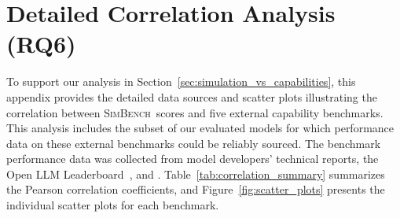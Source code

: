 \documentclass{article} %
\begin{document}
\section{Detailed Correlation Analysis (RQ6)}
\label{app:correlation_plots}

To support our analysis in Section~\ref{sec:simulation_vs_capabilities}, this appendix provides the detailed data sources and scatter plots illustrating the correlation between \textsc{SimBench}\ scores and five external capability benchmarks. This analysis includes the subset of our evaluated models for which performance data on these external benchmarks could be reliably sourced. The benchmark performance data was collected from model developers' technical reports, the Open LLM Leaderboard~\citet{open-llm-leaderboard-v2}, and \citet{vals_mmlu_pro_2025}. Table~\ref{tab:correlation_summary} summarizes the Pearson correlation coefficients, and Figure~\ref{fig:scatter_plots} presents the individual scatter plots for each benchmark.
\end{document}
